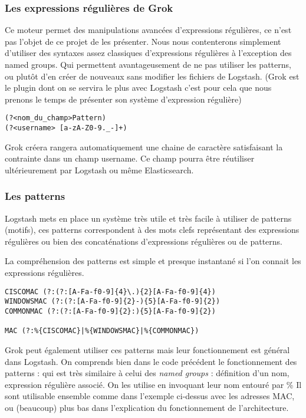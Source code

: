 \subsubsection{Les expressions régulières de Grok}
Ce moteur permet des manipulations avancées d'expressions régulières, ce n'est pas 
l'objet de ce projet de les présenter. Nous nous contenterons simplement d'utiliser
des syntaxes assez classiques d'expressions régulières à l'exception des named groups. 
Qui permettent avantageusement de ne pas utiliser les patterns, ou plutôt d'en créer
de nouveaux sans modifier les fichiers de Logstash.
{\footnotesize(Grok est le plugin dont on se servira le plus avec Logstash c'est 
pour cela que nous prenons le temps de présenter son système d'expression régulière)}


\begin{lstlisting}[style=logstash,label={lst:grokregex1},caption={Named group}]
(?<nom_du_champ>Pattern) 
(?<username> [a-zA-Z0-9._-]+)
\end{lstlisting}

Grok créera rangera automatiquement une chaine de caractère satisfaisant la contrainte 
\ipath{/[a-zA-Z0-9.\_-]+/}  dans un champ  username. 
Ce champ pourra être réutiliser ultérieurement par Logstash ou même Elasticsearch.


\subsubsection{Les patterns}
Logstash mets en place un système très utile et très facile à utiliser de patterns 
(motifs), ces patterns correspondent à des mots clefs représentant des expressions 
régulières ou bien des concaténations d'expressions régulières ou de patterns.

La compréhension des patterns est simple et presque instantané si l'on connait les
expressions régulières.
\begin{lstlisting}[style=logstash,label={lst:patternsexplication1},caption={Exemple de définition et d'utilisation de Patterns}]
CISCOMAC (?:(?:[A-Fa-f0-9]{4}\.){2}[A-Fa-f0-9]{4})
WINDOWSMAC (?:(?:[A-Fa-f0-9]{2}-){5}[A-Fa-f0-9]{2})
COMMONMAC (?:(?:[A-Fa-f0-9]{2}:){5}[A-Fa-f0-9]{2})

MAC (?:%{CISCOMAC}|%{WINDOWSMAC}|%{COMMONMAC})
\end{lstlisting}

Grok peut également utiliser ces patterns mais leur fonctionnement est général dans
Logstash.
On comprends bien dans le code précédent le fonctionnement des patterns : qui est
très similaire à celui des \textit{named groups} : définition d'un nom, expression
régulière associé. On les utilise en invoquant leur nom entouré par \%{} 
Il sont utilisable ensemble comme dans l'exemple ci-dessus avec les adresses MAC,
ou (beaucoup) plus bas dans l'explication du fonctionnement de l'architecture.

